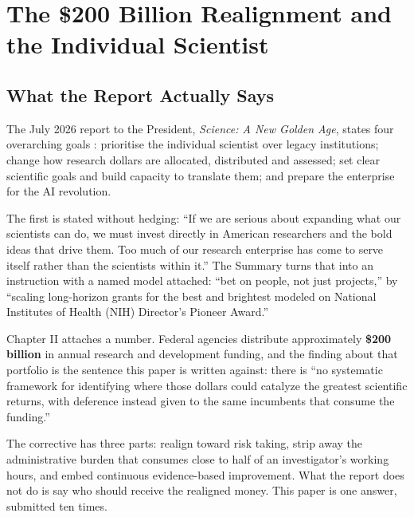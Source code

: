 \section{The \$200 Billion Realignment and the Individual Scientist}

\subsection{What the Report Actually Says}

The July 2026 report to the President, \textit{Science: A New Golden Age},
states four overarching goals \cite{kratsios2026sciencegoldenage}: prioritise
the individual scientist over legacy institutions; change how research dollars
are allocated, distributed and assessed; set clear scientific goals and build
capacity to translate them; and prepare the enterprise for the AI revolution.

The first is stated without hedging: ``If we are serious about expanding what
our scientists can do, we must invest directly in American researchers and the
bold ideas that drive them. Too much of our research enterprise has come to
serve itself rather than the scientists within it.'' The Summary turns that into
an instruction with a named model attached: ``bet on people, not just
projects,'' by ``scaling long-horizon grants for the best and brightest modeled
on National Institutes of Health (NIH) Director's Pioneer Award.''

Chapter II attaches a number. Federal agencies distribute approximately
\textbf{\$200 billion} in annual research and development funding, and the
finding about that portfolio is the sentence this paper is written against:
there is ``no systematic framework for identifying where those dollars could
catalyze the greatest scientific returns, with deference instead given to the
same incumbents that consume the funding.''

The corrective has three parts: realign toward risk taking, strip away the
administrative burden that consumes close to half of an investigator's working
hours, and embed continuous evidence-based improvement. What the report does not
do is say who should receive the realigned money. This paper is one answer,
submitted ten times.


